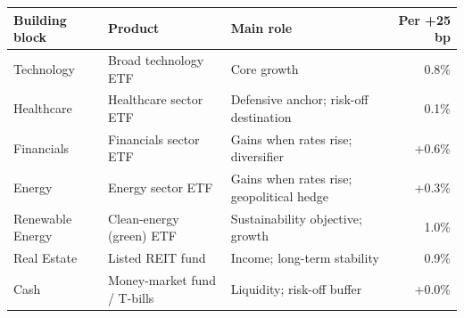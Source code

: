 \begin{tabular}{@{}lllr@{}}
\toprule
\textbf{Building block} & \textbf{Product} & \textbf{Main role} & \textbf{Per +25 bp} \\
\midrule
Technology & Broad technology ETF & Core growth & \textminus{}0.8\% \\
Healthcare & Healthcare sector ETF & Defensive anchor; risk-off destination & \textminus{}0.1\% \\
Financials & Financials sector ETF & Gains when rates rise; diversifier & +0.6\% \\
Energy & Energy sector ETF & Gains when rates rise; geopolitical hedge & +0.3\% \\
Renewable Energy & Clean-energy (green) ETF & Sustainability objective; growth & \textminus{}1.0\% \\
Real Estate & Listed REIT fund & Income; long-term stability & \textminus{}0.9\% \\
Cash & Money-market fund / T-bills & Liquidity; risk-off buffer & +0.0\% \\
\bottomrule
\end{tabular}